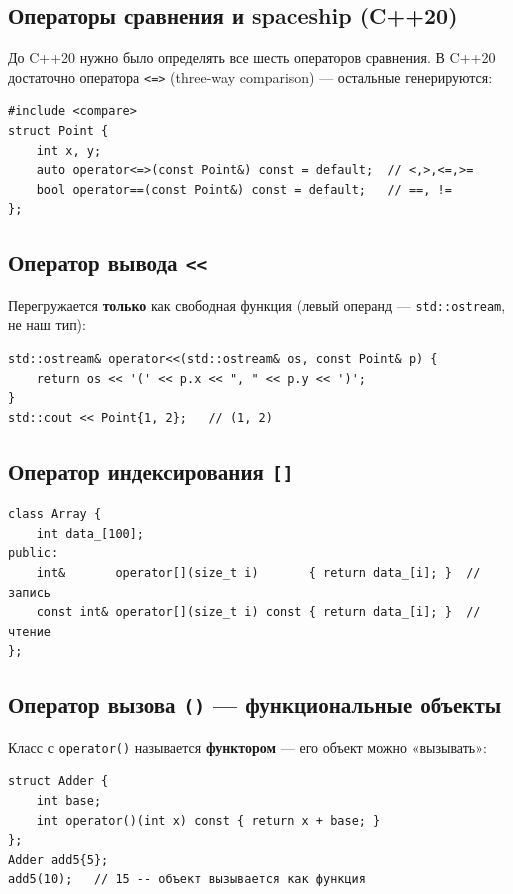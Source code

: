 \subsection{Операторы сравнения и spaceship (C++20)}

До C++20 нужно было определять все шесть операторов сравнения. В C++20 достаточно
оператора \texttt{<=>} (three-way comparison) --- остальные генерируются:

\begin{lstlisting}
#include <compare>
struct Point {
    int x, y;
    auto operator<=>(const Point&) const = default;  // <,>,<=,>=
    bool operator==(const Point&) const = default;   // ==, !=
};
\end{lstlisting}

\subsection{Оператор вывода \texttt{<<}}

Перегружается \textbf{только} как свободная функция (левый операнд ---
\texttt{std::ostream}, не наш тип):

\begin{lstlisting}
std::ostream& operator<<(std::ostream& os, const Point& p) {
    return os << '(' << p.x << ", " << p.y << ')';
}
std::cout << Point{1, 2};   // (1, 2)
\end{lstlisting}

\subsection{Оператор индексирования \texttt{[]}}

\begin{lstlisting}
class Array {
    int data_[100];
public:
    int&       operator[](size_t i)       { return data_[i]; }  // запись
    const int& operator[](size_t i) const { return data_[i]; }  // чтение
};
\end{lstlisting}

\subsection{Оператор вызова \texttt{()} --- функциональные объекты}

Класс с \texttt{operator()} называется \textbf{функтором} --- его объект можно
«вызывать»:

\begin{lstlisting}
struct Adder {
    int base;
    int operator()(int x) const { return x + base; }
};
Adder add5{5};
add5(10);   // 15 -- объект вызывается как функция
\end{lstlisting}

